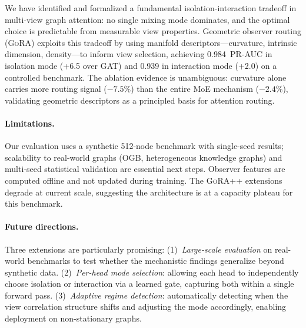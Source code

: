 \documentclass[11pt,a4paper]{article}
\newcommand{\ours}{\textsc{GoRA}}  %
\newcommand{\ourspp}{\textsc{GoRA++}}
\begin{document}
We have identified and formalized a fundamental isolation-interaction
tradeoff in multi-view graph attention: no single mixing mode dominates,
and the optimal choice is predictable from measurable view properties.
Geometric observer routing (\ours{}) exploits this tradeoff by using
manifold descriptors---curvature, intrinsic dimension, density---to
inform view selection, achieving 0.984~PR-AUC in isolation mode (+6.5
over GAT) and 0.939 in interaction mode (+2.0) on a controlled
benchmark.
The ablation evidence is unambiguous: curvature alone carries more
routing signal ($-7.5\%$) than the entire MoE mechanism ($-2.4\%$),
validating geometric descriptors as a principled basis for
attention routing.

\paragraph{Limitations.}
Our evaluation uses a synthetic 512-node benchmark with single-seed
results; scalability to real-world graphs (OGB, heterogeneous knowledge
graphs) and multi-seed statistical validation are essential next steps.
Observer features are computed offline and not updated during training.
The \ourspp{} extensions degrade at current scale, suggesting the
architecture is at a capacity plateau for this benchmark.

\paragraph{Future directions.}
Three extensions are particularly promising:
(1)~\emph{Large-scale evaluation} on real-world benchmarks to test
whether the mechanistic findings generalize beyond synthetic data.
(2)~\emph{Per-head mode selection}: allowing each head to independently
choose isolation or interaction via a learned gate, capturing both
within a single forward pass.
(3)~\emph{Adaptive regime detection}: automatically detecting when the
view correlation structure shifts and adjusting the mode accordingly,
enabling deployment on non-stationary graphs.



\end{document}
